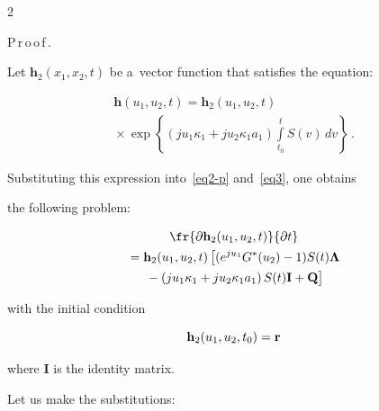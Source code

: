 \begin{multicols}{2}
\noindent


P\,r\,o\,o\,f\,.\ \  


Let $\mathbf{h}_2(x_1,x_2,t)$ be a~vector function that satisfies the equation:


\begin{multline}


\label{eq12}


\mathbf{h}\left(u_1,u_2,t\right)=


\mathbf{h}_2\left(u_1,u_2,t\right)\\


{}\times\exp


\left\{ \!\left(ju_1\kappa_1+ju_2\kappa_1a_1\right)\int\limits_{t_0}^tS(v)\,dv\right\}\,.


\end{multline}





Substituting this expression into~\eqref{eq2-p} and~\eqref{eq3}, one obtains


the following problem:


\begin{multline}


\fr{\partial {\mathbf{h}_2(u_1,u_2,t)}}{\partial t}\\


{}=


\mathbf{h}_2(u_1,u_2,t)\left[(e^{ju_1}G^*(u_2)-1)S(t)\mathbf{\Lambda}\right.


\\


\left.{}-\left(ju_1\kappa_1+ju_2\kappa_1a_1\right)S(t)\mathbf{I}+\mathbf{Q}


\vphantom{e^{ju_1}G^*(u_2)}


\right]


\label{eq13}


\end{multline}


with the initial condition


\begin{equation}


\label{eq14}


{\bf h}_2(u_1,u_2,t_0)={\bf r}


\end{equation}


where {\bf I} is the identity matrix.





Let us make the substitutions:



\end{multicols}
